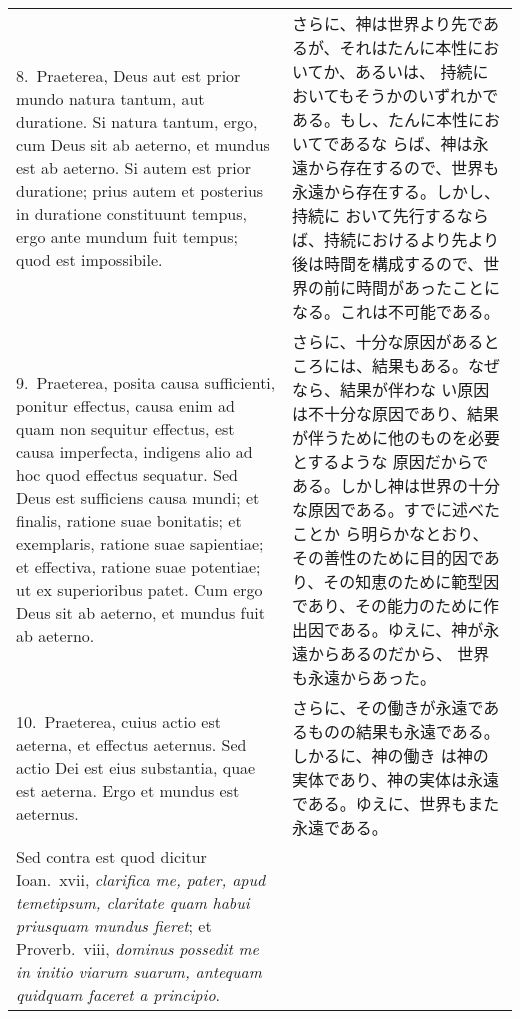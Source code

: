 \documentclass[10pt]{jsarticle} %
\begin{document}
\begin{longtable}{p{21em}p{21em}}

8.~{\sc Praeterea}, Deus aut est prior mundo natura tantum, aut duratione. Si
 natura tantum, ergo, cum Deus sit ab aeterno, et mundus est ab
 aeterno. Si autem est prior duratione; prius autem et posterius in
 duratione constituunt tempus, ergo ante mundum fuit tempus; quod est
 impossibile.

&


さらに、神は世界より先であるが、それはたんに本性においてか、あるいは、
持続においてもそうかのいずれかである。もし、たんに本性においてであるな
らば、神は永遠から存在するので、世界も永遠から存在する。しかし、持続に
おいて先行するならば、持続におけるより先より後は時間を構成するので、世
界の前に時間があったことになる。これは不可能である。

\\



9.~{\sc Praeterea}, posita causa sufficienti, ponitur effectus, causa enim ad
 quam non sequitur effectus, est causa imperfecta, indigens alio ad hoc
 quod effectus sequatur. Sed Deus est sufficiens causa mundi; et
 finalis, ratione suae bonitatis; et exemplaris, ratione suae
 sapientiae; et effectiva, ratione suae potentiae; ut ex superioribus
 patet. Cum ergo Deus sit ab aeterno, et mundus fuit ab aeterno.

&

さらに、十分な原因があるところには、結果もある。なぜなら、結果が伴わな
い原因は不十分な原因であり、結果が伴うために他のものを必要とするような
原因だからである。しかし神は世界の十分な原因である。すでに述べたことか
ら明らかなとおり、その善性のために目的因であり、その知恵のために範型因
であり、その能力のために作出因である。ゆえに、神が永遠からあるのだから、
世界も永遠からあった。


\\



10.~{\sc Praeterea}, cuius actio est aeterna, et effectus
 aeternus. Sed actio Dei est eius substantia, quae est aeterna. Ergo et
 mundus est aeternus.

&


さらに、その働きが永遠であるものの結果も永遠である。しかるに、神の働き
は神の実体であり、神の実体は永遠である。ゆえに、世界もまた永遠である。

\\



{\sc Sed contra est quod} dicitur Ioan.~{\sc xvii}, {\it clarifica me,
 pater, apud temetipsum, claritate quam habui priusquam mundus fieret};
 et Proverb.~{\sc viii}, {\it dominus possedit me in initio viarum
 suarum, antequam quidquam faceret a principio}.


\end{longtable}
\end{document}

